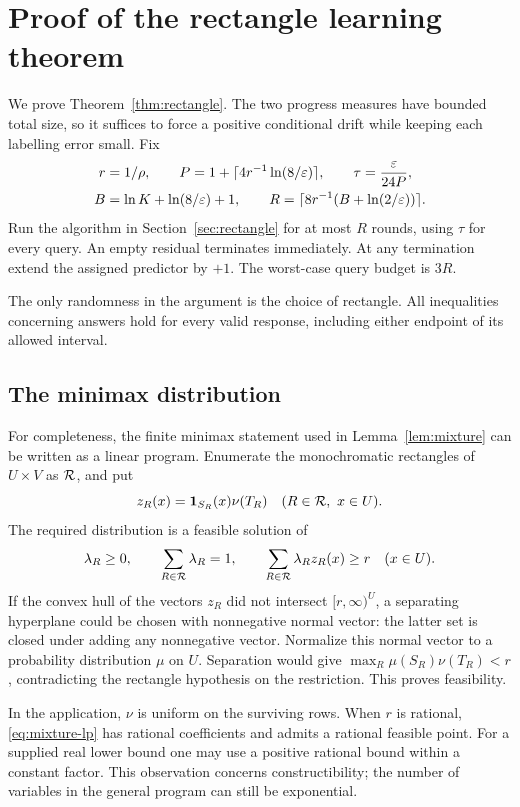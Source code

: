 \section{Proof of the rectangle learning theorem}\label{app:rectangle}
We prove Theorem~\ref{thm:rectangle}. The two progress measures have bounded total size, so it suffices to force a positive conditional drift while keeping each labelling error small. Fix
\begin{align}
 r&=1/\rho,\qquad P=1+\lceil 4r^{-1}\ln(8/\varepsilon)\rceil,\qquad
 \tau=\frac{\varepsilon}{24P},\label{eq:rectparams1}\\
 B&=\ln K+\ln(8/\varepsilon)+1,\qquad
 R=\lceil 8r^{-1}(B+\ln(2/\varepsilon))\rceil.\label{eq:rectparams2}
\end{align}
Run the algorithm in Section~\ref{sec:rectangle} for at most $R$ rounds, using $\tau$ for every query. An empty residual terminates immediately. At any termination extend the assigned predictor by $+1$. The worst-case query budget is $3R$.

The only randomness in the argument is the choice of rectangle. All inequalities concerning answers hold for every valid response, including either endpoint of its allowed interval.

\subsection{The minimax distribution}
For completeness, the finite minimax statement used in Lemma~\ref{lem:mixture} can be written as a linear program. Enumerate the monochromatic rectangles of $U\times V$ as $\mathcal R$, and put
\[
 z_R(x)=\mathbf 1_{S_R}(x)\nu(T_R)\quad(R\in\mathcal R,\ x\in U).
\]
The required distribution is a feasible solution of
\begin{equation}
 \lambda_R\ge0,\qquad \sum_{R\in\mathcal R}\lambda_R=1,
 \qquad \sum_{R\in\mathcal R}\lambda_R z_R(x)\ge r\quad(x\in U).
\label{eq:mixture-lp}
\end{equation}
If the convex hull of the vectors $z_R$ did not intersect $[r,\infty)^U$, a separating hyperplane could be chosen with nonnegative normal vector: the latter set is closed under adding any nonnegative vector. Normalize this normal vector to a probability distribution $\mu$ on $U$. Separation would give $\max_R\mu(S_R)\nu(T_R)<r$, contradicting the rectangle hypothesis on the restriction. This proves feasibility.

In the application, $\nu$ is uniform on the surviving rows. When $r$ is rational, \eqref{eq:mixture-lp} has rational coefficients and admits a rational feasible point. For a supplied real lower bound one may use a positive rational bound within a constant factor. This observation concerns constructibility; the number of variables in the general program can still be exponential.


